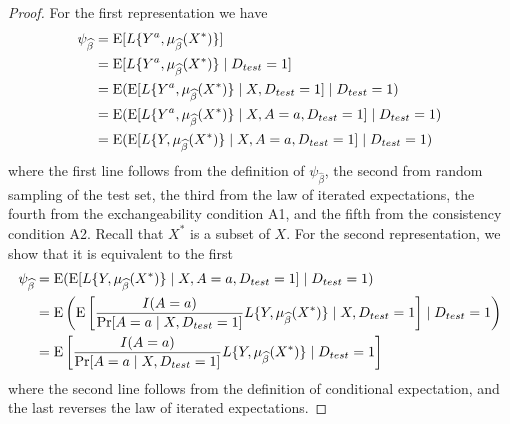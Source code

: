     \begin{proof}
        For the first representation we have 
        \begin{align*}
            \psi_{\widehat{\beta}} &= \operatorname{E}[L\{Y^{a}, \mu_{\widehat{\beta}}(X^*)\}] \\
            & = \operatorname{E}[L\{Y^{a}, \mu_{\widehat{\beta}}(X^*)\}\mid D_{test} = 1] \\
            & = \operatorname{E}(\operatorname{E}[L\{Y^{a}, \mu_{\widehat{\beta}}(X^*)\}\mid X, D_{test} = 1] \mid D_{test} = 1) \\
            & = \operatorname{E}(\operatorname{E}[L\{Y^{a}, \mu_{\widehat{\beta}}(X^*)\}\mid X, A = a, D_{test} = 1] \mid D_{test} = 1) \\
            & = \operatorname{E}(\operatorname{E}[L\{Y, \mu_{\widehat{\beta}}(X^*)\}\mid X, A = a, D_{test} = 1] \mid D_{test} = 1) 
        \end{align*}
        where the first line follows from the definition of $\psi_{\widehat{\beta}}$, the second from random sampling of the test set, the third from the law of iterated expectations, the fourth from the exchangeability condition A1, and the fifth from the consistency condition A2. Recall that $X^*$ is a subset of $X$. For the second representation, we show that it is equivalent to the first 
        \begin{align*}
            \psi_{\widehat{\beta}} &= \operatorname{E}(\operatorname{E}[L\{Y, \mu_{\widehat{\beta}}(X^*)\}\mid X,A = a, D_{test} = 1] \mid D_{test} = 1) \\
            &= \operatorname{E}\left(\operatorname{E}\left[\frac{I(A = a)}{\Pr[A = a \mid X,D_{test} = 1]}L\{Y, \mu_{\widehat{\beta}}(X^*)\} \mid X,D_{test} = 1\right] \mid D_{test} = 1\right)\\
            &= \operatorname{E}\left[\frac{I(A = a)}{\Pr[A = a \mid X,D_{test} = 1]}L\{Y, \mu_{\widehat{\beta}}(X^*)\} \mid D_{test} = 1\right]
        \end{align*}
        where the second line follows from the definition of conditional expectation, and the last reverses the law of iterated expectations.
    \end{proof}
    
